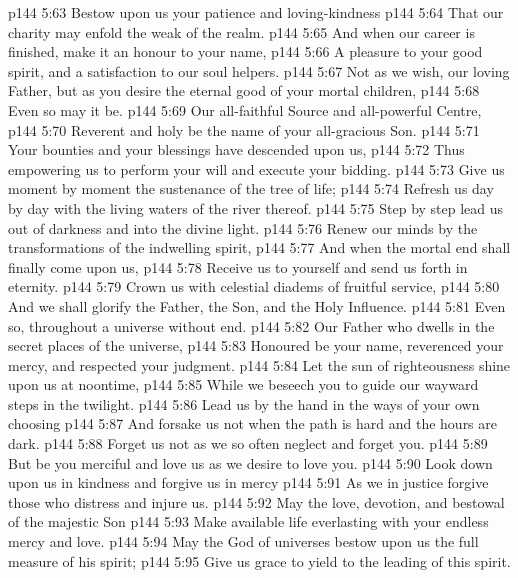\vs p144 5:63 Bestow upon us your patience and loving\hyp{}kindness
\vs p144 5:64 \hsetoff That our charity may enfold the weak of the realm.
\vs p144 5:65 And when our career is finished, make it an honour to your name,
\vs p144 5:66 \hsetoff A pleasure to your good spirit, and a satisfaction to our soul helpers.
\vs p144 5:67 Not as we wish, our loving Father, but as you desire the eternal good of your mortal children,
\vs p144 5:68 \hsetoff Even so may it be.
\separatorshort
\vs p144 5:69 Our all\hyp{}faithful Source and all\hyp{}powerful Centre,
\vs p144 5:70 \hsetoff Reverent and holy be the name of your all\hyp{}gracious Son.
\vs p144 5:71 Your bounties and your blessings have descended upon us,
\vs p144 5:72 \hsetoff Thus empowering us to perform your will and execute your bidding.
\vs p144 5:73 Give us moment by moment the sustenance of the tree of life;
\vs p144 5:74 \hsetoff Refresh us day by day with the living waters of the river thereof.
\vs p144 5:75 Step by step lead us out of darkness and into the divine light.
\vs p144 5:76 \hsetoff Renew our minds by the transformations of the indwelling spirit,
\vs p144 5:77 And when the mortal end shall finally come upon us,
\vs p144 5:78 \hsetoff Receive us to yourself and send us forth in eternity.
\vs p144 5:79 Crown us with celestial diadems of fruitful service,
\vs p144 5:80 \hsetoff And we shall glorify the Father, the Son, and the Holy Influence.
\vs p144 5:81 Even so, throughout a universe without end.
\separatorshort
\vs p144 5:82 Our Father who dwells in the secret places of the universe,
\vs p144 5:83 \hsetoff Honoured be your name, reverenced your mercy, and respected your judgment.
\vs p144 5:84 Let the sun of righteousness shine upon us at noontime,
\vs p144 5:85 \hsetoff While we beseech you to guide our wayward steps in the twilight.
\vs p144 5:86 Lead us by the hand in the ways of your own choosing
\vs p144 5:87 \hsetoff And forsake us not when the path is hard and the hours are dark.
\vs p144 5:88 Forget us not as we so often neglect and forget you.
\vs p144 5:89 \hsetoff But be you merciful and love us as we desire to love you.
\vs p144 5:90 Look down upon us in kindness and forgive us in mercy
\vs p144 5:91 \hsetoff As we in justice forgive those who distress and injure us.
\vs p144 5:92 May the love, devotion, and bestowal of the majestic Son
\vs p144 5:93 \hsetoff Make available life everlasting with your endless mercy and love.
\vs p144 5:94 May the God of universes bestow upon us the full measure of his spirit;
\vs p144 5:95 \hsetoff Give us grace to yield to the leading of this spirit.
